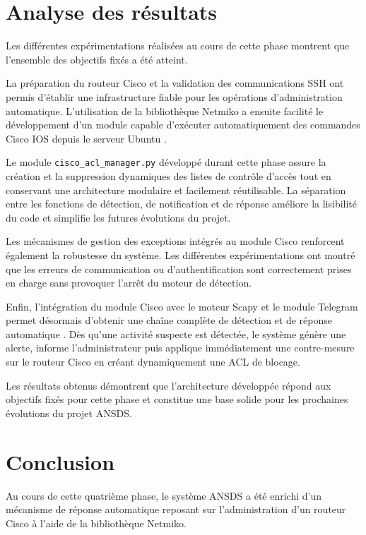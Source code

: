 \section{Analyse des résultats}

Les différentes expérimentations réalisées au cours de cette phase montrent que l'ensemble des objectifs fixés a été atteint.

La préparation du routeur Cisco et la validation des communications SSH ont permis d'établir une infrastructure fiable pour les opérations d'administration automatique. L'utilisation de la bibliothèque Netmiko a ensuite facilité le développement d'un module capable d'exécuter automatiquement des commandes Cisco IOS depuis le serveur Ubuntu \cite{netmiko_docs,cisco_ios}.

Le module \texttt{cisco\_acl\_manager.py} développé durant cette phase assure la création et la suppression dynamiques des listes de contrôle d'accès tout en conservant une architecture modulaire et facilement réutilisable. La séparation entre les fonctions de détection, de notification et de réponse améliore la lisibilité du code et simplifie les futures évolutions du projet.

Les mécanismes de gestion des exceptions intégrés au module Cisco renforcent également la robustesse du système. Les différentes expérimentations ont montré que les erreurs de communication ou d'authentification sont correctement prises en charge sans provoquer l'arrêt du moteur de détection.

Enfin, l'intégration du module Cisco avec le moteur Scapy et le module Telegram permet désormais d'obtenir une chaîne complète de détection et de réponse automatique \cite{scapy_docs}. Dès qu'une activité suspecte est détectée, le système génère une alerte, informe l'administrateur puis applique immédiatement une contre-mesure sur le routeur Cisco en créant dynamiquement une ACL de blocage.

Les résultats obtenus démontrent que l'architecture développée répond aux objectifs fixés pour cette phase et constitue une base solide pour les prochaines évolutions du projet ANSDS.

\section{Conclusion}

Au cours de cette quatrième phase, le système ANSDS a été enrichi d'un mécanisme de réponse automatique reposant sur l'administration d'un routeur Cisco à l'aide de la bibliothèque Netmiko.

